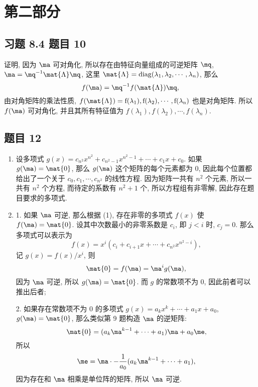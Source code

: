 \newpage
\section{第二部分}

\subsection*{ 习题 8.4 题目 10 }
\begin{solution}
证明, 因为 $\ma$ 可对角化, 所以存在由特征向量组成的可逆矩阵 $\mq$, $\ma = \mq^{-1} \mat{\Lambda} \mq$, 这里 $\mat{\Lambda} = \mathrm{diag}(\lambda_1, \lambda_2, \cdots, \lambda_n)$, 那么
\[
f(\ma) = \mq^{-1} f(\mat{\Lambda}) \mq,
\]
由对角矩阵的乘法性质, $f(\mat{\Lambda}) = \mathrm{f(\lambda_1), f(\lambda_2), \cdots, f(\lambda_n)}$ 也是对角矩阵. 所以 $f(\ma)$ 可对角化, 并且其所有特征值为 $f(\lambda_1), f(\lambda_2), \cdots, f(\lambda_n)$.
\end{solution}

\subsection*{ 题目 12 }
\begin{solution}
\begin{enumerate}
    \item 设多项式 $g(x) = c_{n^2} x^{n^2} + c_{n^2 - 1}x^{n^2 - 1} + \cdots + c_1 x + c_0$. 如果 $g(\ma) = \mat{0}$, 那么 $g(\ma)$ 这个矩阵的每个元素都为 $0$, 因此每个位置都给出了一个关于 $c_0, c_1, \cdots, c_{n^2}$ 的线性方程. 因为矩阵一共有 $n^2$ 个元素, 所以一共有 $n^2$ 个方程, 而待定的系数有 $n^2 + 1$ 个, 所以方程组有非零解, 因此存在题目要求的多项式.
    \item 1. 如果 $\ma$ 可逆, 那么根据 (1), 存在非零的多项式 $f(x)$ 使 $f(\ma) = \mat{0}$. 设其中次数最小的非零系数是 $c_i$, 即 $j < i$ 时, $c_j = 0$. 那么多项式可以表示为
    \[
    f(x) = x^i ( c_i + c_{i + 1} x + \cdots + c_{n^2} x^{n^2 - i}),
    \]
    记 $g(x) = f(x) / x^i$, 则
    \[
    \mat{0} = f(\ma) = \ma^i g(\ma),
    \]
    因为 $\ma$ 可逆, 所以 $g(\ma) = \mat{0}$. 而 $g$ 的常数项不为 $0$, 因此前者可以推出后者;

    2. 如果存在常数项不为 $0$ 的多项式 $g(x) = a_k x^k + \cdots + a_1 x + a_0$, $g(\ma) = \mat{0}$, 那么类似第 9 题构造 $\ma$ 的逆矩阵:
    \[
        \mat{0} = (a_k \ma^{k - 1} + \cdots + a_1) \ma + a_0 \me,
    \]
    所以
    \[
        \me = \ma \cdot -\frac{1}{a_0}(a_k \ma^{k - 1} + \cdots + a_1),
    \]
    因为存在和 $\ma$ 相乘是单位阵的矩阵, 所以 $\ma$ 可逆.
\end{enumerate}
\end{solution}

